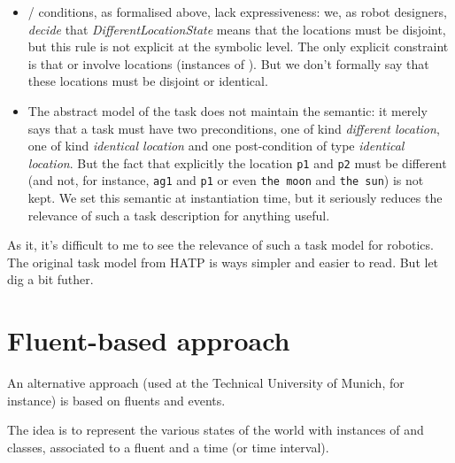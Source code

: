 \begin{itemize}

    \item  {}/
    conditions, as formalised above, lack expressiveness: we, as robot designers,
    \emph{decide} that \emph{DifferentLocationState} means that the locations
    must be disjoint, but this rule is not explicit at the symbolic level. The
    only explicit constraint is that  or
     involve locations (instances of
    ). But we don't formally say that these
    locations must be disjoint or identical.

    \item  The abstract model of the task does not maintain the semantic: it
    merely says that a  task must have two preconditions, one of
    kind \emph{different location}, one of kind \emph{identical location} and
    one post-condition of type \emph{identical location}. But the fact that
    explicitly the location {\tt p1} and {\tt p2} must be different (and not,
    for instance, {\tt ag1} and {\tt p1} or even {\tt the moon} and {\tt the
    sun}) is not kept.  We set this semantic at instantiation time, but it
    seriously reduces the relevance of such a task description for anything
    useful.

\end{itemize}

As it, it's difficult to me to see the relevance of such a task model for
robotics. The original task model from HATP is ways simpler and easier to read.
But let dig a bit futher.


\section{Fluent-based approach}

An alternative approach (used at the Technical University of Munich, for
instance) is based on fluents and events.

The idea is to represent the various states of the world with instances of
 and  classes, associated to a fluent and a time
(or time interval).

%

